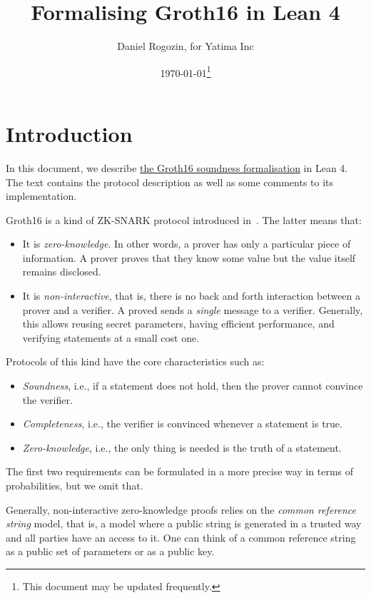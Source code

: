 \documentclass{article}
\title{Formalising Groth16 in Lean 4}
\author{Daniel Rogozin, for Yatima Inc}
\date{\today\footnote{This document may be updated frequently.}}
\theoremstyle{definition}
\theoremstyle{remark}
\begin{document}
\maketitle

\section{Introduction}

In this document, we describe \href{https://github.com/yatima-inc/ZKSnark.lean/blob/main/ZkSNARK/Groth16/KnowledgeSoundness.lean}{the Groth16 soundness formalisation} in Lean 4.
The text contains the protocol description as well as some comments to its implementation.

Groth16 is a kind of ZK-SNARK protocol introduced in~\cite{groth2016size}. The latter means that:

\begin{itemize}
\item It is \emph{zero-knowledge}.
  In other words, a prover has only a particular piece of information.
  A prover proves that they know some value but the value itself remains disclosed.
\item It is \emph{non-interactive}, that is, there is no back and forth interaction
between a prover and a verifier. A proved sends a \emph{single} message to a verifier. Generally, this allows reusing secret parameters,
having efficient performance, and verifying statements at a small cost one.
\end{itemize}

Protocols of this kind have the core characteristics such as:
\begin{itemize}
\item \emph{Soundness}, i.e., if a statement does not hold, then the prover cannot convince the verifier.
\item \emph{Completeness}, i.e., the verifier is convinced whenever a statement is true.
\item \emph{Zero-knowledge}, i.e., the only thing is needed is the truth of a statement.
\end{itemize}
The first two requirements can be formulated in a more precise way in terms of probabilities, but we omit that.

Generally, non-interactive zero-knowledge proofs relies on the \emph{common reference string} model,
that is, a model where a public string is generated in a trusted way and all parties have an access to it.
One can think of a common reference string as a public set of parameters or as a public key.
\end{document}
